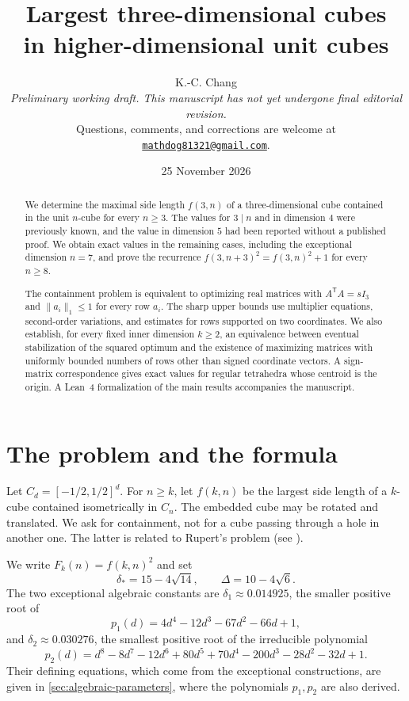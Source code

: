\documentclass[11pt]{article}
\title{Largest three-dimensional cubes\\in higher-dimensional unit cubes}
\author{\normalsize\begin{minipage}{0.87\textwidth}\centering
  {\large K.-C. Chang}\\[5pt]
  \emph{Preliminary working draft. This manuscript has not yet undergone final editorial revision.}\\[4pt]
  Questions, comments, and corrections are welcome at\\[2pt]
  \href{mailto:mathdog81321@gmail.com}{\texttt{mathdog81321@gmail.com}}.
\end{minipage}}
\date{\normalsize 25 November 2026}
\numberwithin{equation}{section}
\theoremstyle{definition}
\theoremstyle{definition}
\newcommand{\ds}{\delta_*}
\newcommand{\Dlt}{\Delta}
\begin{document}
\maketitle
\begin{abstract}
We determine the maximal side length $f(3,n)$ of a three-dimensional
cube contained in the unit $n$-cube for every $n\ge3$. The values
for $3\mid n$ and in dimension $4$ were previously known, and the value
in dimension $5$ had been reported without a published proof.
We obtain exact values in the remaining cases, including the exceptional
dimension $n=7$, and prove the recurrence
$f(3,n+3)^2=f(3,n)^2+1$ for every $n\ge8$.

The containment problem is equivalent to optimizing real matrices with
$A^{\mathsf T}A=sI_3$ and $\|a_i\|_1\le1$ for every row $a_i$.
The sharp upper bounds use multiplier equations, second-order variations,
and estimates for rows supported on two coordinates. We also establish,
for every fixed inner dimension $k\ge2$, an equivalence between eventual
stabilization of the squared optimum and the existence of maximizing
matrices with uniformly bounded numbers of rows other than signed
coordinate vectors. A sign-matrix correspondence gives exact values for
regular tetrahedra whose centroid is the origin. A Lean~4 formalization
of the main results accompanies the manuscript.
\end{abstract}
\medskip
{\setcounter{tocdepth}{1}\small\tableofcontents}
\newpage

\section{The problem and the formula}
\label{sec:main}
Let $C_d=[-1/2,1/2]^d$.  For $n\ge k$, let $f(k,n)$ be the largest
side length of a $k$-cube contained isometrically in $C_n$.  The embedded cube
may be rotated and translated.  We ask for containment, not for a
cube passing through a hole in another one.  The latter is related to
Rupert's problem (see \cite{HSW2018,SteiningerYurkevich2023}).

We write $F_k(n)=f(k,n)^2$ and set
\[
 \ds=15-4\sqrt{14},\qquad \Dlt=10-4\sqrt6.
\]
The two exceptional algebraic constants are
$\delta_1\approx0.014925$, the smaller positive root of
\[
 p_1(d)=4d^4-12d^3-67d^2-66d+1,
\]
and $\delta_2\approx0.030276$, the smallest positive root of the
irreducible polynomial
\[
 p_2(d)=d^8-8d^7-12d^6+80d^5+70d^4-200d^3-28d^2-32d+1.
\]
Their defining equations, which come from the exceptional
constructions, are given in \cref{sec:algebraic-parameters}, where
the polynomials $p_1,p_2$ are also derived.
\end{document}
